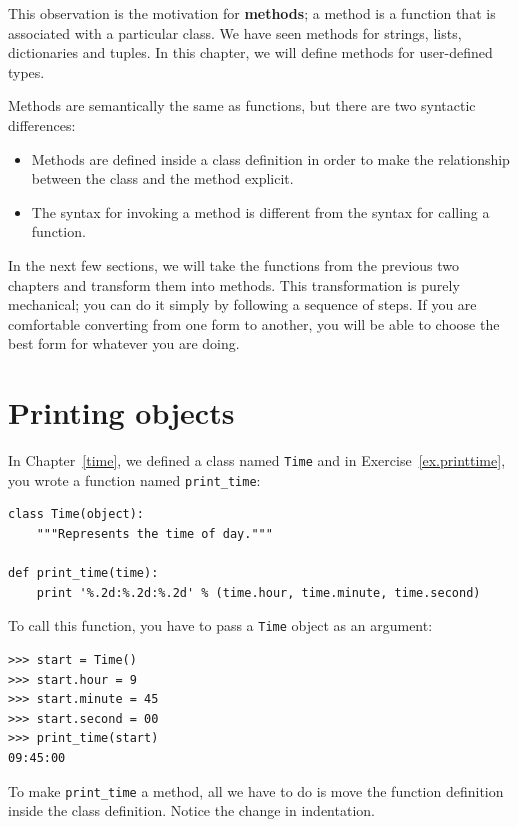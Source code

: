 \documentclass[12pt,a4paper,final,twoside,onecolumn,titlepage]{book}
\begin{document}
This observation is the motivation for {\bf methods}; a method is
a function that is associated with a particular class.
We have seen methods for strings, lists, dictionaries and tuples.
In this chapter, we will define methods for user-defined types.

Methods are semantically the same as functions, but there are
two syntactic differences:

\begin{itemize}

\item Methods are defined inside a class definition in order
to make the relationship between the class and the method explicit.

\item The syntax for invoking a method is different from the
syntax for calling a function.

\end{itemize}

In the next few sections, we will take the functions from the previous
two chapters and transform them into methods.  This transformation is
purely mechanical; you can do it simply by following a sequence of
steps.  If you are comfortable converting from one form to another,
you will be able to choose the best form for whatever you are doing.


\section{Printing objects}

In Chapter~\ref{time}, we defined a class named
{\tt Time} and in Exercise~\ref{ex.printtime}, you 
wrote a function named \verb"print_time":

\begin{verbatim}
class Time(object):
    """Represents the time of day."""

def print_time(time):
    print '%.2d:%.2d:%.2d' % (time.hour, time.minute, time.second)
\end{verbatim}
%
To call this function, you have to pass a {\tt Time} object as an
argument:

\begin{verbatim}
>>> start = Time()
>>> start.hour = 9
>>> start.minute = 45
>>> start.second = 00
>>> print_time(start)
09:45:00
\end{verbatim}
%
To make \verb"print_time" a method, all we have to do is
move the function definition inside the class definition.  Notice
the change in indentation.
\end{document}
